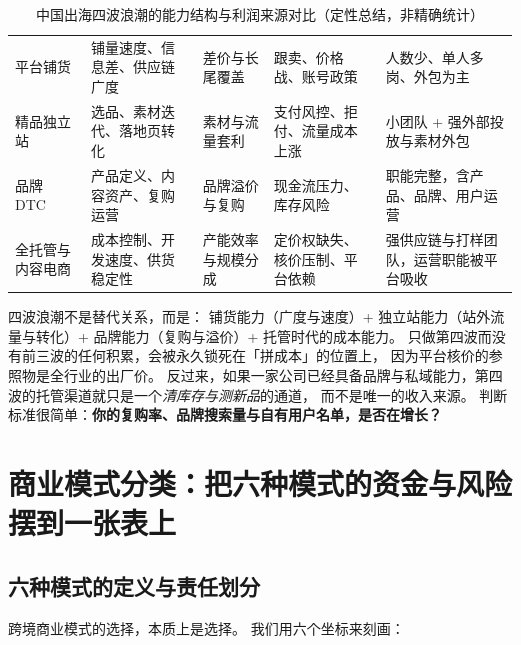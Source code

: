 \begin{table}[htbp]
\centering
\caption{中国出海四波浪潮的能力结构与利润来源对比（定性总结，非精确统计）}
\label{tab:cbec-waves}
\small
\begin{tabularx}{\textwidth}{L{1.9cm} L{2.3cm} L{2.3cm} L{2.0cm} Y}
\toprule
{} &  &  &  &  \\
\midrule
平台铺货 & 铺量速度、信息差、供应链广度 & 差价与长尾覆盖 & 跟卖、价格战、账号政策 & 人数少、单人多岗、外包为主 \\
\addlinespace
精品独立站 & 选品、素材迭代、落地页转化 & 素材与流量套利 & 支付风控、拒付、流量成本上涨 & 小团队 + 强外部投放与素材外包 \\
\addlinespace
品牌 DTC & 产品定义、内容资产、复购运营 & 品牌溢价与复购 & 现金流压力、库存风险 & 职能完整，含产品、品牌、用户运营 \\
\addlinespace
全托管与内容电商 & 成本控制、开发速度、供货稳定性 & 产能效率与规模分成 & 定价权缺失、核价压制、平台依赖 & 强供应链与打样团队，运营职能被平台吸收 \\
\bottomrule
\end{tabularx}
\end{table}

\begin{keypoint}
四波浪潮不是替代关系，而是：
铺货能力（广度与速度）+ 独立站能力（站外流量与转化）+ 品牌能力（复购与溢价）+ 托管时代的成本能力。
只做第四波而没有前三波的任何积累，会被永久锁死在「拼成本」的位置上，
因为平台核价的参照物是全行业的出厂价。
反过来，如果一家公司已经具备品牌与私域能力，第四波的托管渠道就只是一个\emph{清库存与测新品}的通道，
而不是唯一的收入来源。
判断标准很简单：\textbf{你的复购率、品牌搜索量与自有用户名单，是否在增长？}
\end{keypoint}

\section{商业模式分类：把六种模式的资金与风险摆到一张表上}
\label{sec:cbec-model}

\subsection{六种模式的定义与责任划分}

跨境商业模式的选择，本质上是选择。
我们用六个坐标来刻画：

